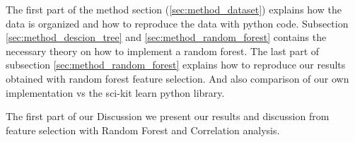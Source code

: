 The first part of the method section (\ref{sec:method_dataset}) explains how the data is organized and
how to reproduce the data with python code. Subsection
\ref{sec:method_descion_tree} and \ref{sec:method_random_forest} contains the
necessary theory on how to implement a random forest. The last part of
subsection \ref{sec:method_random_forest} explains how to reproduce our results
obtained with random forest feature selection. And also comparison of our own
implementation vs the sci-kit learn python library.  



The first part of our Discussion we present our results and discussion from
feature selection with Random Forest and Correlation analysis.  






